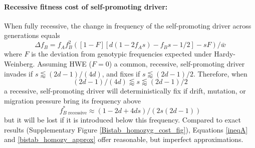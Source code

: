 \documentclass[12pt,letterpaper]{article}
\newcommand{\gc}[1]{{ \color{red} #1}}
\begin{document}
\paragraph{Recessive fitness cost of self-promoting driver:} %
When fully recessive, the change in frequency of the self-promoting driver across generations equals 
\begin{equation}
\Delta f_B=f_A f_B^2 \left( [1-F][ d(1-2 f_A s) - f_B s-1/2] - s  F \right)/\bar{w}
\label{deltadriver}
\end{equation}
where $F$ is the deviation from genotypic frequencies expected under Hardy-Weinberg. %
Assuming HWE  ($F=0$) a common, recessive, self-promoting driver invades if $s\lessapprox(2 d - 1)/(4 d)$, and fixes if
 $s\lessapprox(2d-1)/2$. 
 Therefore, when 
\begin{equation}
(2 d - 1)/(4 d)  \lessapprox  s  \lessapprox  (2d-1)/2\label{ineqA}
\end{equation} 
a recessive, self-promoting driver will deterministically fix if drift,
 	mutation, or migration pressure bring its frequency above
\begin{equation} 
f^*_{B\text{ recessive}} \approx (1-2d+4ds)/(2s(2d-1)) \label{bistab_homozy_approx}
\end{equation}
 but it will be lost if it is introduced below this frequency. 
Compared to exact results (Supplementary Figure \ref{Bistab_homozyg_cost_fig}), Equations
 \gc{\eqref{ineqA} and} \eqref{bistab_homozy_approx} offer reasonable, but imperfect approximations. 
\end{document}
